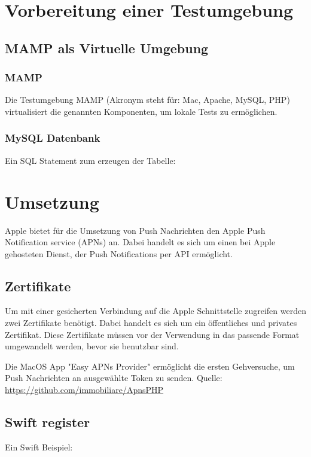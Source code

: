 \section{Vorbereitung einer Testumgebung}

\subsection{MAMP als Virtuelle Umgebung}

\subsubsection{MAMP}
Die Testumgebung MAMP (Akronym steht für: Mac, Apache, MySQL, PHP) virtualisiert die genannten Komponenten, um lokale Tests zu ermöglichen.

\subsubsection{MySQL Datenbank}

Ein SQL Statement zum erzeugen der Tabelle:






\section{Umsetzung}
Apple bietet für die Umsetzung von Push Nachrichten den Apple Push Notification service (APNs) an. Dabei handelt es sich um einen bei Apple gehosteten Dienst, der Push Notifications per API ermöglicht.


\subsection{Zertifikate}
Um mit einer gesicherten Verbindung auf die Apple Schnittstelle zugreifen werden zwei Zertifikate benötigt. Dabei handelt es sich um ein öffentliches und privates Zertifikat. Diese Zertifikate müssen vor der Verwendung in das passende Format umgewandelt werden, bevor sie benutzbar sind.

Die MacOS App "Easy APNs Provider" ermöglicht die ersten Gehversuche, um Push Nachrichten an ausgewählte Token zu senden.
Quelle: \url{https://github.com/immobiliare/ApnsPHP}



\subsection{Swift register}
Ein Swift Beispiel:



